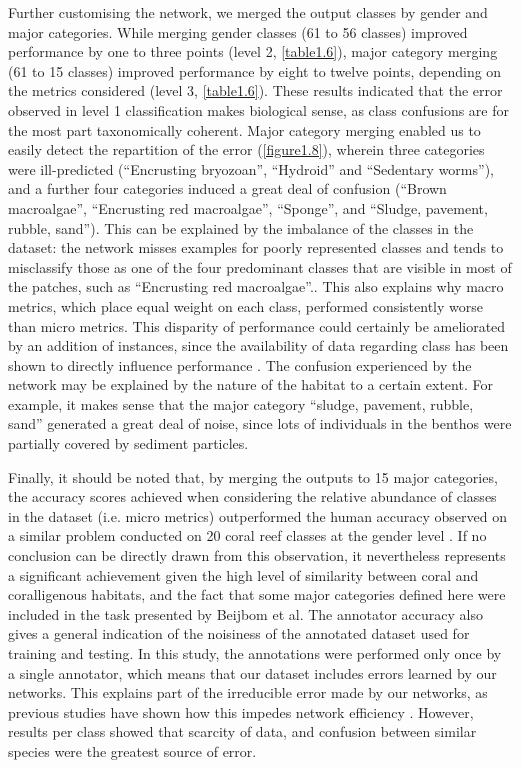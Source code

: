 Further customising the network, we merged the output classes by gender and major categories. While merging gender classes (61 to 56 classes) improved performance by one to three points (level 2, \autoref{table1.6}), major category merging (61 to 15 classes) improved performance by eight to twelve points, depending on the metrics considered (level 3, \autoref{table1.6}). These results indicated that the error observed in level 1 classification makes biological sense, as class confusions are for the most part taxonomically coherent. Major category merging enabled us to easily detect the repartition of the error (\autoref{figure1.8}), wherein three categories were ill-predicted (“Encrusting bryozoan”, “Hydroid” and “Sedentary worms”), and a further four categories induced a great deal of confusion (“Brown macroalgae”, “Encrusting red macroalgae”, “Sponge”, and “Sludge, pavement, rubble, sand”). This can be explained by the imbalance of the classes in the dataset: the network misses examples for poorly represented classes and tends to misclassify those as one of the four predominant classes that are visible in most of the patches, such as “Encrusting red macroalgae”.. This also explains why macro metrics, which place equal weight on each class, performed consistently worse than micro metrics. This disparity of performance could certainly be ameliorated by an addition of instances, since the availability of data regarding class has been shown to directly influence performance \citep{zhou_learning_2014}. The confusion experienced by the network may be explained by the nature of the habitat to a certain extent. For example, it makes sense that the major category “sludge, pavement, rubble, sand” generated a great deal of noise, since lots of individuals in the benthos were partially covered by sediment particles.

Finally, it should be noted that, by merging the outputs to 15 major categories, the accuracy scores achieved when considering the relative abundance of classes in the dataset (i.e. micro metrics) outperformed the human accuracy observed on a similar problem conducted on 20 coral reef classes at the gender level \citep{beijbom_towards_2015}. If no conclusion can be directly drawn from this observation, it nevertheless represents a significant achievement given the high level of similarity between coral and coralligenous habitats, and the fact that some major categories defined here were included in the task presented by Beijbom et al. The annotator accuracy also gives a general indication of the noisiness of the annotated dataset used for training and testing. In this study, the annotations were performed only once by a single annotator, which means that our dataset includes errors learned by our networks. This explains part of the irreducible error made by our networks, as previous studies have shown how this impedes network efficiency \citep{mishkin_systematic_2016}. However, results per class showed that scarcity of data, and confusion between similar species were the greatest source of error. 

